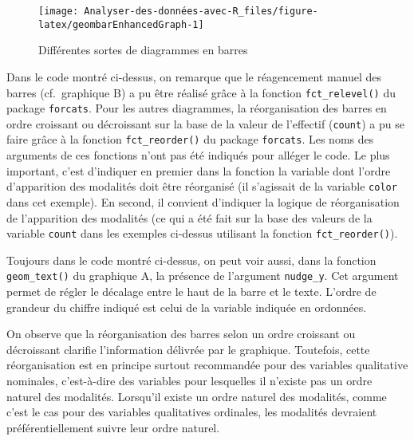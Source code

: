 \documentclass[
  french,
]{book}
\begin{document}
\begin{figure}

{\centering \texttt{[image: Analyser-des-données-avec-R\_files/figure-latex/geombarEnhancedGraph-1]} 

}

\caption{Différentes sortes de diagrammes en barres}\label{fig:geombarEnhancedGraph}
\end{figure}

Dans le code montré ci-dessus, on remarque que le réagencement manuel des barres (cf.~graphique B) a pu être réalisé grâce à la fonction \texttt{fct\_relevel()} du package \texttt{forcats}. Pour les autres diagrammes, la réorganisation des barres en ordre croissant ou décroissant sur la base de la valeur de l'effectif (\texttt{count}) a pu se faire grâce à la fonction \texttt{fct\_reorder()} du package \texttt{forcats}. Les noms des arguments de ces fonctions n'ont pas été indiqués pour alléger le code. Le plus important, c'est d'indiquer en premier dans la fonction la variable dont l'ordre d'apparition des modalités doit être réorganisé (il s'agissait de la variable \texttt{color} dans cet exemple). En second, il convient d'indiquer la logique de réorganisation de l'apparition des modalités (ce qui a été fait sur la base des valeurs de la variable \texttt{count} dans les exemples ci-dessus utilisant la fonction \texttt{fct\_reorder()}).

Toujours dans le code montré ci-dessus, on peut voir aussi, dans la fonction \texttt{geom\_text()} du graphique A, la présence de l'argument \texttt{nudge\_y}. Cet argument permet de régler le décalage entre le haut de la barre et le texte. L'ordre de grandeur du chiffre indiqué est celui de la variable indiquée en ordonnées.

On observe que la réorganisation des barres selon un ordre croissant ou décroissant clarifie l'information délivrée par le graphique. Toutefois, cette réorganisation est en principe surtout recommandée pour des variables qualitative nominales, c'est-à-dire des variables pour lesquelles il n'existe pas un ordre naturel des modalités. Lorsqu'il existe un ordre naturel des modalités, comme c'est le cas pour des variables qualitatives ordinales, les modalités devraient préférentiellement suivre leur ordre naturel.
\end{document}
